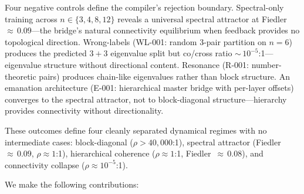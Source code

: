 \noindent Four negative controls define the compiler's rejection
boundary. Spectral-only training across $n \in \{3, 4, 8, 12\}$ reveals
a universal spectral attractor at Fiedler ${\approx}\,0.09$---the
bridge's natural connectivity equilibrium when feedback provides no
topological direction. Wrong-labels (WL-001: random 3-pair partition on
$n{=}6$) produces the predicted $3{+}3$ eigenvalue split but co/cross
ratio ${\sim}\,10^{-5}$:1---eigenvalue structure without directional
content. Resonance (R-001: number-theoretic pairs) produces chain-like
eigenvalues rather than block structure. An emanation architecture
(E-001: hierarchical master bridge with per-layer offsets) converges to
the spectral attractor, not to block-diagonal structure---hierarchy
provides connectivity without directionality.

These outcomes define four cleanly separated dynamical regimes with no
intermediate cases: block-diagonal ($\rho > 40{,}000$:1), spectral
attractor (Fiedler~${\approx}\,0.09$, $\rho \approx 1$:1),
hierarchical coherence ($\rho \approx 1$:1, Fiedler~${\approx}\,0.08$),
and connectivity collapse ($\rho \approx 10^{-5}$:1).

\medskip
\noindent We make the following contributions:

